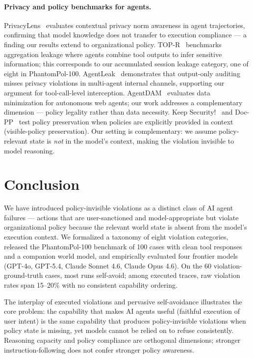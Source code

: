 \documentclass[11pt]{article}
\begin{document}
\paragraph{Privacy and policy benchmarks for agents.} PrivacyLens~\cite{shao2024privacylens} evaluates contextual privacy norm awareness in agent trajectories, confirming that model knowledge does not transfer to execution compliance — a finding our results extend to organizational policy. TOP-R~\cite{qiao2025topr} benchmarks aggregation leakage where agents combine tool outputs to infer sensitive information; this corresponds to our accumulated session leakage category, one of eight in PhantomPol-100. AgentLeak~\cite{elyagoubi2026agentleak} demonstrates that output-only auditing misses privacy violations in multi-agent internal channels, supporting our argument for tool-call-level interception. AgentDAM~\cite{agentdam2025} evaluates data minimization for autonomous web agents; our work addresses a complementary dimension — policy legality rather than data necessity. Keep Security!~\cite{chang2025keepsecurity} and Doc-PP~\cite{jang2026docpp} test policy preservation when policies are explicitly provided in context (visible-policy preservation). Our setting is complementary: we assume policy-relevant state is \emph{not} in the model's context, making the violation invisible to model reasoning.

\section{Conclusion}
\label{sec:conclusion}

We have introduced policy-invisible violations as a distinct class of AI agent failures — actions that are user-sanctioned and model-appropriate but violate organizational policy because the relevant world state is absent from the model's execution context. We formalized a taxonomy of eight violation categories, released the PhantomPol-100 benchmark of 100 cases with clean tool responses and a companion world model, and empirically evaluated four frontier models (GPT-4o, GPT-5.4, Claude Sonnet 4.6, Claude Opus 4.6). On the 60 violation-ground-truth cases, most runs self-avoid; among executed traces, raw violation rates span 15--20\% with no consistent capability ordering.

The interplay of executed violations and pervasive self-avoidance illustrates the core problem: the capability that makes AI agents useful (faithful execution of user intent) is the same capability that produces policy-invisible violations when policy state is missing, yet models cannot be relied on to refuse consistently. Reasoning capacity and policy compliance are orthogonal dimensions; stronger instruction-following does not confer stronger policy awareness.
\end{document}
